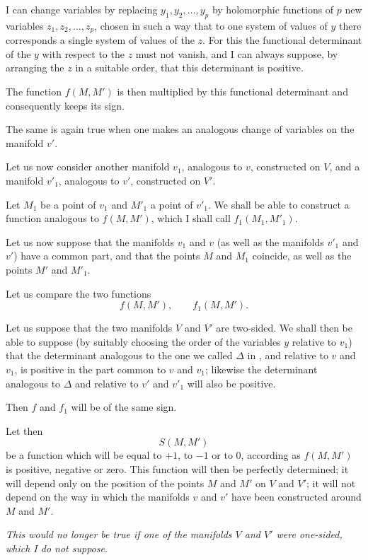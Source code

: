 \documentclass{article}
\begin{document}
I can change variables by replacing $y_{1}, y_{2}, \ldots, y_{p}$ by holomorphic functions of $p$ new variables $z_{1}, z_{2}, \ldots, z_{p}$, chosen in such a way that to one system of values of $y$ there corresponds a single system of values of the $z$. For this the functional determinant of the $y$ with respect to the $z$ must not vanish, and I can always suppose, by arranging the $z$ in a suitable order, that this determinant is positive.

The function $f(M, M')$ is then multiplied by this functional determinant and consequently keeps its sign.

The same is again true when one makes an analogous change of variables on the manifold $v'$.

Let us now consider another manifold $v_{1}$, analogous to $v$, constructed on $V$, and a manifold $v'_{1}$, analogous to $v'$, constructed on $V'$.

Let $M_{1}$ be a point of $v_{1}$ and $M'_{1}$ a point of $v'_{1}$. We shall be able to construct a function analogous to $f(M, M')$, which I shall call $f_{1}(M_{1}, M'_{1})$.

Let us now suppose that the manifolds $v_{1}$ and $v$ (as well as the manifolds $v'_{1}$ and $v'$) have a common part, and that the points $M$ and $M_{1}$ coincide, as well as the points $M'$ and $M'_{1}$.

Let us compare the two functions
\[
f(M, M'), \qquad f_{1}(M, M').
\]

Let us suppose that the two manifolds $V$ and $V'$ are two-sided. We shall then be able to suppose (by suitably choosing the order of the variables $y$ relative to $v_{1}$) that the determinant analogous to the one we called $\Delta$ in , and relative to $v$ and $v_{1}$, is positive in the part common to $v$ and $v_{1}$; likewise the determinant analogous to $\Delta$ and relative to $v'$ and $v'_{1}$ will also be positive.

Then $f$ and $f_{1}$ will be of the same sign.

Let then
\[
S(M, M')
\]
be a function which will be equal to $+1$, to $-1$ or to 0, according as $f(M, M')$ is positive, negative or zero. This function will then be perfectly determined; it will depend only on the position of the points $M$ and $M'$ on $V$ and $V'$; it will not depend on the way in which the manifolds $v$ and $v'$ have been constructed around $M$ and $M'$.

\emph{This would no longer be true if one of the manifolds $V$ and $V'$ were one-sided, which I do not suppose}.
\end{document}
